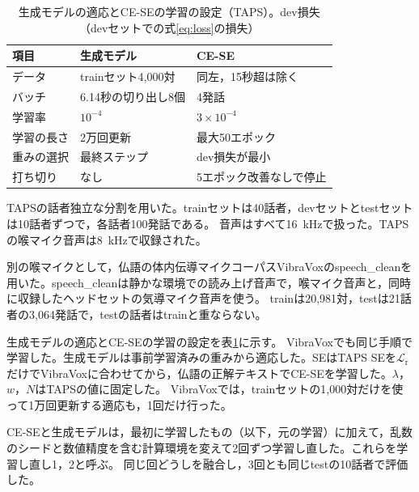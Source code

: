 \documentclass[xelatex,ja=standard,a4paper,twocolumn,10pt]{bxjsarticle}
\makeatletter
\renewcommand{\section}{\@startsection{section}{1}{\z@}{1.0ex plus .3ex}{.5ex}{\normalfont\large\sffamily\bfseries}}
\makeatother
\begin{document}
\section{実験条件}
\label{sec:setup}
\begin{table}[t]
  \centering
  \caption{生成モデルの適応とCE-SEの学習の設定（TAPS）。dev損失（devセットでの式\eqref{eq:loss}の損失）}
  \label{tab:hparams}
  \footnotesize
  \setlength{\tabcolsep}{3.0pt}
  \begin{tabular}{lll}
    \toprule
    項目 & 生成モデル & CE-SE \\
    \midrule
    データ & trainセット4,000対 & 同左，15秒超は除く \\
    バッチ & 6.14秒の切り出し8個 & 4発話 \\
    学習率 & $10^{-4}$ & $3\times10^{-4}$ \\
    学習の長さ & 2万回更新 & 最大50エポック \\
    重みの選択 & 最終ステップ & dev損失が最小 \\
    打ち切り & なし & 5エポック改善なしで停止 \\
    \bottomrule
  \end{tabular}
\end{table}

TAPS\cite{taps}の話者独立な分割を用いた。trainセットは40話者，devセットとtestセットは10話者ずつで，各話者100発話である。
音声はすべて16~kHzで扱った。TAPSの喉マイク音声は8~kHzで収録された。

別の喉マイクとして，仏語の体内伝導マイクコーパスVibraVox\cite{vibravox}のspeech\_cleanを用いた。speech\_cleanは静かな環境での読み上げ音声で，喉マイク音声と，同時に収録したヘッドセットの気導マイク音声を使う。
trainは20,981対，testは21話者の3,064発話で，testの話者はtrainと重ならない。

生成モデルの適応とCE-SEの学習の設定を表\ref{tab:hparams}に示す。
VibraVoxでも同じ手順で学習した。生成モデルは事前学習済みの重みから適応した。SEはTAPS SEを$\mathcal{L}_\mathrm{r}$だけでVibraVoxに合わせてから，仏語の正解テキストでCE-SEを学習した。$\lambda$，$w$，$N$はTAPSの値に固定した。
VibraVoxでは，trainセットの1,000対だけを使って1万回更新する適応も，1回だけ行った。

CE-SEと生成モデルは，最初に学習したもの（以下，元の学習）に加えて，乱数のシードと数値精度を含む計算環境を変えて2回ずつ学習し直した。これらを学習し直し1，2と呼ぶ。
同じ回どうしを融合し，3回とも同じtestの10話者で評価した。
\end{document}
